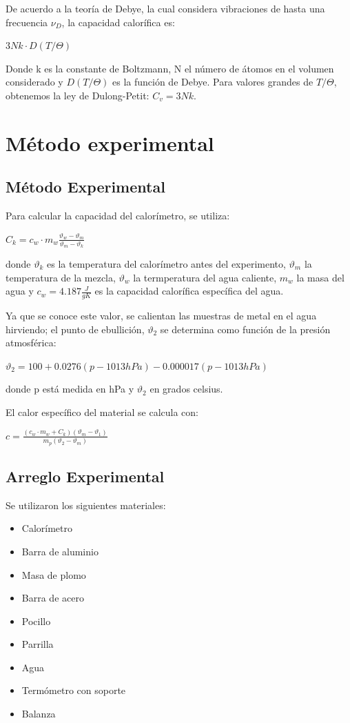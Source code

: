 \documentclass[12pt]{article}
\begin{document}
De acuerdo a la teoría de Debye, la cual considera vibraciones de hasta una frecuencia $\nu_{D}$, la capacidad calorífica es:
\begin{center}
\large{$3 Nk\cdot D(T/\Theta)$}
\end{center}
Donde k es la constante de Boltzmann, N el número de átomos en el volumen considerado y $D(T/\Theta)$ es la función de Debye. Para valores grandes de $T/\Theta$, obtenemos la ley de Dulong-Petit: $C_{v}=3Nk$.
\section{Método experimental}
\subsection{M\'etodo Experimental}
Para calcular la capacidad del calorímetro, se utiliza:
\begin{center}
\large{$C_{k}=c_{w}\cdot m_{w} \frac{\vartheta_{w}-\vartheta_{m}}{\vartheta_{m}-\vartheta_{k}}$}
\end{center}
donde $\vartheta_{k}$ es la temperatura del calorímetro antes del experimento, $\vartheta_{m}$ la temperatura de la mezcla, $\vartheta_{w}$ la termperatura del agua caliente, $m_{w}$ la masa del agua y $c_{w}=4.187 \frac{J}{gK}$ es la capacidad calorífica específica del agua.

Ya que se conoce este valor, se calientan las muestras de metal en el agua hirviendo; el punto de ebullición, $\vartheta_{2}$ se determina como función de la presión atmosférica:
\begin{center}
\large{$\vartheta_{2}=100+0.0276(p-1013hPa)-0.000017(p-1013hPa)$}
\end{center}
donde p está medida en hPa y $\vartheta_{2}$ en grados celsius.

El calor específico del material se calcula con:
\begin{center}
\large{$c=\frac{(c_{w}\cdot m_{w}+C_{k})(\vartheta_{m}-\vartheta_{1})}{m_{p}(\vartheta_{2}-\vartheta_{m})}$}
\end{center}\cite{ce:2}
\subsection{Arreglo Experimental}
Se utilizaron los siguientes materiales:
\begin{itemize}
\item Calorímetro
\item Barra de aluminio
\item Masa de plomo
\item Barra de acero
\item Pocillo
\item Parrilla
\item Agua
\item Termómetro con soporte
\item Balanza
\end{itemize}
\end{document}
